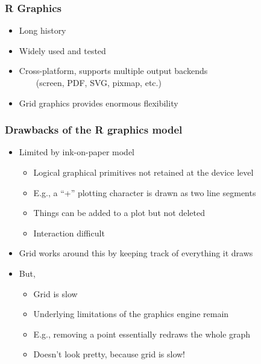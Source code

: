 \documentclass[compress]{beamer}
\begin{document}
\begin{frame}
  \titlepage
\end{frame}





\begin{frame}
  \frametitle{R Graphics}
  \begin{itemize}
  \item Long history
  \item Widely used and tested
  \item Cross-platform, supports multiple output backends \\
    ~~~~(screen, PDF, SVG, pixmap, etc.)
  \item Grid graphics provides enormous flexibility
  \end{itemize}
\end{frame}

\begin{frame}
  \frametitle{Drawbacks of the R graphics model}
  \begin{itemize}
  \item Limited by ink-on-paper model
    \begin{itemize}
    \item Logical graphical primitives not retained at the device level
    \item E.g., a ``+'' plotting character is drawn as two line segments
    \item Things can be added to a plot but not deleted
    \item Interaction difficult
    \end{itemize}
  \item Grid works around this by keeping track of everything it draws
  \item But, 
    \begin{itemize}
    \item Grid is slow
    \item Underlying limitations of the graphics engine remain
    \item E.g., removing a point essentially redraws the whole graph
    \item Doesn't look pretty, because grid is slow!
    \end{itemize}
  \end{itemize}
\end{frame}
\end{document}
